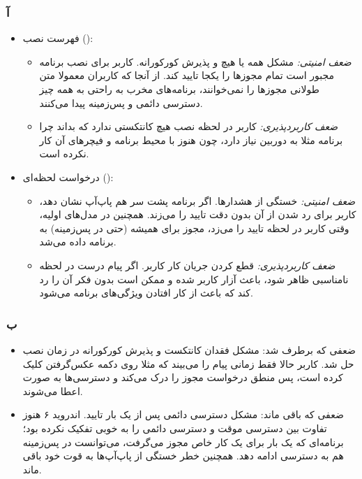 
\subsubsection*{آ}
\begin{itemize}
    \item {فهرست نصب ():} 
    \begin{itemize}
        \item \textit{ضعف امنیتی:} مشکل همه یا هیچ و پذیرش کورکورانه. کاربر برای نصب برنامه مجبور است تمام مجوزها را یکجا تایید کند. از آنجا که کاربران معمولا متن طولانی مجوزها را نمی‌خوانند، برنامه‌های مخرب به راحتی به همه چیز دسترسی دائمی و پس‌زمینه پیدا می‌کنند.
        \item \textit{ضعف کاربردپذیری:} کاربر در لحظه نصب هیچ کانتکستی ندارد که بداند چرا برنامه مثلا به دوربین نیاز دارد، چون هنوز با محیط برنامه و فیچرهای آن کار نکرده است.
    \end{itemize}
    \item {درخواست لحظه‌ای ():}
    \begin{itemize}
        \item \textit{ضعف امنیتی:} خستگی از هشدارها. اگر برنامه پشت سر هم پاپ‌آپ نشان دهد، کاربر برای رد شدن از آن بدون دقت تایید را می‌زند. همچنین در مدل‌های اولیه، وقتی کاربر در لحظه تایید را می‌زد، مجوز برای همیشه (حتی در پس‌زمینه) به برنامه داده می‌شد.
        \item \textit{ضعف کاربردپذیری:} قطع کردن جریان کار کاربر. اگر پیام درست در لحظه نامناسبی ظاهر شود، باعث آزار کاربر شده و ممکن است بدون فکر آن را رد کند که باعث از کار افتادن ویژگی‌های برنامه می‌شود.
    \end{itemize}
\end{itemize}

\subsubsection*{ب}
\begin{itemize}
    \item {ضعفی که برطرف شد:} مشکل فقدان کانتکست و پذیرش کورکورانه در زمان نصب حل شد. کاربر حالا فقط زمانی پیام را می‌بیند که مثلا روی دکمه عکس‌گرفتن کلیک کرده است، پس منطق درخواست مجوز را درک می‌کند و دسترسی‌ها به صورت  اعطا می‌شوند.
    \item {ضعفی که باقی ماند:} مشکل دسترسی دائمی پس از یک بار تایید. اندروید ۶ هنوز تفاوت بین دسترسی موقت و دسترسی دائمی را به خوبی تفکیک نکرده بود؛ برنامه‌ای که یک بار برای یک کار خاص مجوز می‌گرفت، می‌توانست در پس‌زمینه هم به دسترسی ادامه دهد. همچنین خطر خستگی از پاپ‌آپ‌ها به قوت خود باقی ماند.
\end{itemize}

